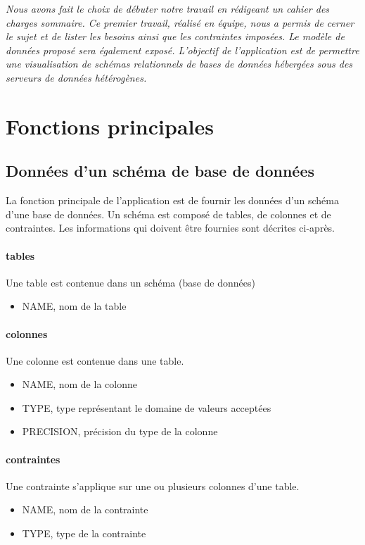 \textit{Nous avons fait le choix de débuter notre travail en rédigeant un cahier des charges sommaire. Ce premier travail, réalisé en équipe, nous a permis de cerner le sujet et de lister les besoins ainsi que les contraintes imposées. Le modèle de données proposé sera également exposé. L’objectif de l'application est de permettre une visualisation de schémas relationnels de bases de données hébergées sous des serveurs de données hétérogènes.}


\section{Fonctions principales}
		\subsection{Données d'un schéma de base de données}
		La fonction principale de l'application est de fournir les données d'un schéma d'une base de données. Un schéma est composé de tables, de colonnes et de contraintes. Les informations qui doivent être fournies sont décrites ci-après.
		
			\paragraph{tables}
			Une table est contenue dans un schéma (base de données)
				\begin{itemize}
					\item NAME, nom de la table
				\end{itemize}
				
			\paragraph{colonnes}
			Une colonne est contenue dans une table.
				\begin{itemize}
					\item NAME, nom de la colonne
					\item TYPE, type représentant le domaine de valeurs acceptées
					\item PRECISION, précision du type de la colonne
				\end{itemize}
				
			\paragraph{contraintes}
			Une contrainte s'applique sur une ou plusieurs colonnes d'une table.
				\begin{itemize}
					\item NAME, nom de la contrainte
					\item TYPE, type de la contrainte
				\end{itemize} 
				
